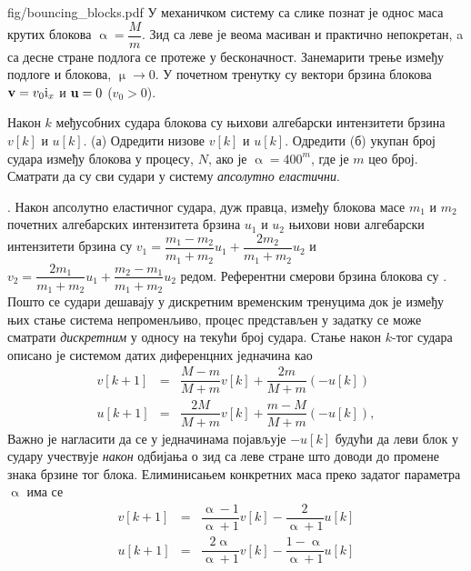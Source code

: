 \mnDifficult
\begin{slikaDesno}{fig/bouncing_blocks.pdf}
\PID У механичком систему са слике познат
је однос 
маса крутих блокова $
\upalpha = \dfrac{M}{m}$. 
Зид са леве је веома масиван и 
практично непокретан, a са десне стране подлога 
се протеже у бесконачност.
Занемарити трење између подлоге 
и блокова, 
$\upmu \to 0$. 
У почетном тренутку су вектори брзина 
блокова
${\bf v} = v_0 {\rm i}_x$ и
${\bf u} = 0$ ($v_0 > 0$). 
\end{slikaDesno}
Након $k$ међусобних судара блокова су 
њихови алгебарски интензитети брзина 
$v[k]$ и $u[k]$.
(а) Одредити низове $v[k]$ и $u[k]$.
Одредити (б) укупан
број судара између блокова у процесу, $N$, 
ако је $\upalpha = 400^m$, где је $m$ цео број.
Сматрати да су сви судари у систему 
\textit{апсолутно еластични}. 

\textit{}. Након 
апсолутно еластичног
судара, дуж правца, између блокова масе $m_1$ и $m_2$ 
почетних алгебарских интензитета брзина $u_1$ и 
$u_2$ њихови нови алгебарски интензитети брзина су 
$v_1 = \dfrac{m_1-m_2}{m_1+m_2} u_1 + 
\dfrac{2m_2}{m_1+m_2} u_2$  и 
$v_2 = 
\dfrac{2 m_1}{m_1+m_2} u_1
+
\dfrac{m_2 - m_1}{m_1 + m_2} u_2  
$ редом. Референтни смерови брзина блокова 
су . \\

\RESENJE  Пошто се судари дешавају у дискретним временским тренуцима 
док је између њих стање система непроменљиво, процес представљен у задатку се може сматрати
\textit{дискретним} у односу на текући број судара. Стање након $k$-тог судара описано је
системом датих диференцних једначина као 
\begin{eqnarray}
    v[k+1] & = & \dfrac{M - m}{M + m} v[k] + \dfrac{2m}{M + m} (-u[k]) \\[2mm]
    u[k+1] & = & \dfrac{2M}{M + m} v[k] + \dfrac{m - M}{M + m} (-u[k]),
\end{eqnarray} 
Важно је нагласити да се у једначинама појављује $-u[k]$ будући да леви блок у судару учествује 
\textit{након} одбијања о зид са леве стране што доводи до промене знака брзине тог блока. 
Елиминисањем конкретних маса преко задатог параметра $\upalpha$ има се
\begin{eqnarray}
    v[k+1] & = & \dfrac{\upalpha - 1}{\upalpha + 1} v[k] - \dfrac{2}{\upalpha + 1} u[k] \\[2mm]
    u[k+1] & = & \dfrac{2\upalpha}{\upalpha + 1} v[k] - \dfrac{1 - \upalpha}{\upalpha + 1} u[k]
\end{eqnarray} 

